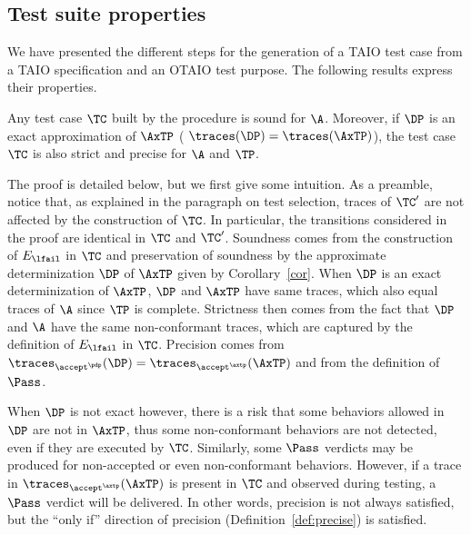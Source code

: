 \documentclass{LMCS}
\theoremstyle{plain}\newtheorem{proposition}[thm]{Proposition}
\begin{document}
\subsection{Test suite properties}
We have presented the different steps for the generation of 
a TAIO test case from a TAIO specification and an OTAIO test purpose.
The following results express their properties.

\begin{thm}\label{theorem-TC}
  Any test case $\TC$ built by the procedure is sound for $\A$.
  Moreover, if $\DP$ is an exact approximation of $\AxTP$ (\ie
  $\traces(\DP) = \traces(\AxTP)$), the test case $\TC$ is also strict
  and precise for $\A$ and $\TP$.
\end{thm}

The proof is detailed below, but we first give some intuition.
As a preamble, notice that, as explained in the paragraph on test selection, 
traces of $\TC'$ are not affected by the construction of $\TC$.
In particular, the transitions considered in the proof are identical in $\TC$ and $\TC'$.
Soundness comes from 
the construction of $E_{\lfail}$ in $\TC$ and preservation of soundness by the approximate determinization $\DP$ of $\AxTP$
given by Corollary~\ref{cor}.
When $\DP$ is an exact determinization of $\AxTP$,
$\DP$ and $\AxTP$ have same traces, which also equal traces of $\A$ 
since $\TP$ is complete. 
Strictness then comes from the fact that $\DP$ and $\A$ 
 have the same non-conformant traces,
which are captured by the definition of $E_{\lfail}$ in $\TC$.
Precision comes from $\traces_{\accept^\pdp}(\DP)=\traces_{\accept^\axtp}(\AxTP)$ and from the definition of $\Pass$.

When $\DP$ is not exact however, there is a risk that some
behaviors allowed in $\DP$ are not in $\AxTP$, thus some
non-conformant behaviors are not detected, even if they are executed
by $\TC$.
Similarly, some $\Pass$ verdicts may be produced for non-accepted 
or even non-conformant behaviors.
However, if a trace in $\traces_{\accept^\axtp}(\AxTP)$ is present in $\TC$ and observed during testing, 
a $\Pass$ verdict will be delivered. In other words, precision 
is not  always satisfied, but the ``only if'' direction of 
precision (Definition~\ref{def:precise}) is satisfied.
\end{document}
